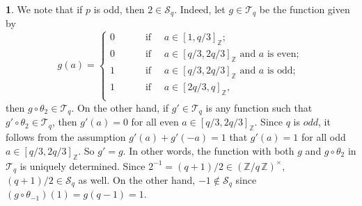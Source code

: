 \documentclass{amsart}[11pt]
\theoremstyle{definition}
\newtheorem{sect}[thm]{}
\numberwithin{equation}{section}
\theoremstyle{notitle}
\begin{document}
\begin{sect}\label{subsec:elementary-elimination-for-s}
We note that if $p$ is odd, then $2\in {\mathscr{S}}_q$. Indeed, let $g\in
{\mathscr{T}}_q$ be the function given by 
\begin{equation}
  \label{eq:38}
 g(a)=
 \begin{cases}
   0    &\qquad     \text{ if } \quad a \in [1, q/3]_{\mathbb{Z}};\\
   0    &\qquad     \text{ if } \quad a \in [q/3, 2q/3]_{\mathbb{Z}} \text{ and } a
   \text{ is even};\\ 
   1   &\qquad     \text{ if } \quad a \in [q/3, 2q/3]_{\mathbb{Z}} \text{ and } a
   \text{ is odd};\\ 
   1    &\qquad     \text{ if } \quad a \in [2q/3, q]_{\mathbb{Z}},\\
 \end{cases}
\end{equation}
then $g\circ \theta_2\in {\mathscr{T}}_q$. On the other hand, if $g'\in {\mathscr{T}}_q$
is any function such that $g'\circ \theta_2\in {\mathscr{T}}_q$, then $g'(a)=0$
for all even $a \in [q/3, 2q/3]_{\mathbb{Z}}$. Since $q$ is $odd$, it follows
from the assumption $g'(a)+g'(-a)=1$ that $g'(a)=1$ for all odd $a\in
[q/3, 2q/3]_{\mathbb{Z}}$. So $g'=g$. In other words, the function with both
$g$ and $g\circ \theta_2$ in ${\mathscr{T}}_q$ is uniquely determined. Since
$2^{-1}=(q+1)/2\in {(\mathbb{Z}/ {q}\, \mathbb{Z})^\times}$, $(q+1)/2\in {\mathscr{S}}_q$ as well.  On the
other hand, $-1\not\in {\mathscr{S}}_q$ since $(g\circ\theta_{-1})(1)=g(q-1)=1$.
\end{sect}

  
 
  
  
  
  
  
  
\end{document}
